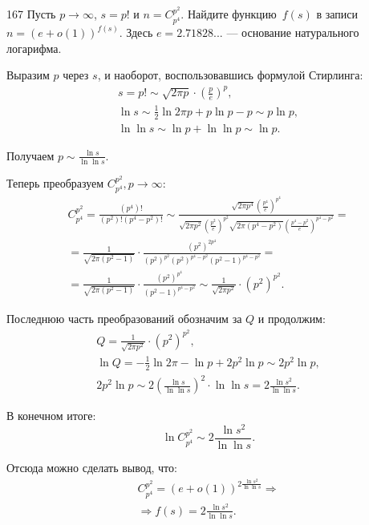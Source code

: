 \begin{task}{167}
Пусть \(p\to\infty\), \(s=p!\) и \(n=C_{p^4}^{p^2}\). Найдите функцию~\(f(s)\) в записи \(n=(e+o(1))^{f(s)}\). Здесь \(e=2.71828...\) --- основание натурального логарифма.
\end{task}

\begin{solution}

Выразим \(p\) через \(s\), и наоборот, воспользовавшись формулой Стирлинга:
\begin{gather*}
    s = p! \sim \sqrt{2\pi p} \cdot \left(\frac{p}{e}\right)^p, \\
    \ln{s} \sim \frac{1}{2}\ln{2\pi p} + p\ln{p} - p \sim p\ln{p}, \\
    \ln{\ln{s}} \sim \ln{p} + \ln{\ln{p}} \sim \ln{p}.
\end{gather*}

Получаем \(\displaystyle p \sim \frac{\ln{s}}{\ln{\ln{s}}}\).

Теперь преобразуем \(C_{p^4}^{p^2}, p \rightarrow \infty\):
\begin{multline*}
    C_{p^4}^{p^2} = \frac{(p^4)!}{(p^2)!(p^4 - p^2)!} \sim \frac{\sqrt{2\pi p^4} \left(\frac{p^4}{e}\right)^{p^4}}{\sqrt{2\pi p^2} \left(\frac{p^2}{e}\right)^{p^2}\sqrt{2\pi \left(p^4 - p^2\right)} \left(\frac{p^4 - p^2}{e}\right)^{p^4 - p^2}} = \\
    = \frac{1}{\sqrt{2\pi(p^2 - 1)}} \cdot \frac{(p^2)^{2p^4}}{(p^2)^{p^2}(p^2)^{p^4-p^2}(p^2 - 1)^{p^4-p^2}} = \\
    = \frac{1}{\sqrt{2\pi(p^2 - 1)}} \cdot \frac{(p^2)^{p^4}}{(p^2 - 1)^{p^4-p^2}} \sim 
    \frac{1}{\sqrt{2\pi p^2}} \cdot (p^2)^{p^2}.
\end{multline*}

Последнюю часть преобразований обозначим за \(Q\) и продолжим:
\begin{gather*}
    Q = \frac{1}{\sqrt{2\pi p^2}} \cdot (p^2)^{p^2}, \\
    \ln{Q} = -\frac{1}{2}\ln{2\pi} - \ln{p} + 2p^2\ln{p} \sim 2p^2\ln{p}, \\
    2p^2\ln{p} \sim 2\left(\frac{\ln{s}}{\ln{\ln{s}}}\right)^2 \cdot \ln{\ln{s}} = 2\frac{\ln{s}^2}{\ln{\ln{s}}}.
\end{gather*}

В конечном итоге:
\begin{equation*}
    \ln{C_{p^4}^{p^2}} \sim 2\frac{\ln{s}^2}{\ln{\ln{s}}}.
\end{equation*}

Отсюда можно сделать вывод, что:
\begin{gather*}
    C_{p^4}^{p^2} = (e + o(1))^{2\frac{\ln{s}^2}{\ln{\ln{s}}}} \Rightarrow \\
    \Rightarrow f(s) = 2\frac{\ln{s}^2}{\ln{\ln{s}}}.
\end{gather*}


\end{solution}
